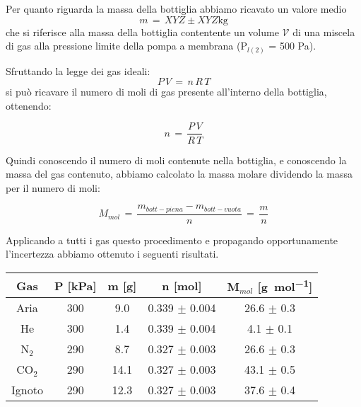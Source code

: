Per quanto riguarda la massa della bottiglia abbiamo ricavato un valore medio
\begin{equation}
	m \, = \, XYZ \pm XYZ \si{\kilogram}
\end{equation}
che si riferisce alla massa della bottiglia contentente un volume $\mathcal{V}$ di una miscela di gas alla pressione limite della pompa a membrana (P$_{l(2)}$ = 500 \si{\Pa}).


Sfruttando la legge dei gas ideali:
\begin{equation}
	P\,V \,=\, n\,R\,T
\end{equation}
%
si può ricavare il numero di moli di gas presente all'interno della bottiglia, ottenendo:

\begin{equation}
	n \,=\, \frac{P\,V}{R\,T}
\end{equation}

Quindi conoscendo il numero di moli contenute nella bottiglia, e conoscendo la massa del gas contenuto,
abbiamo calcolato la massa molare dividendo la massa per il numero di moli:

\begin{equation}
	M_{mol} \,=\, \frac{m_{bott-piena} - m_{bott-vuota}}{n}\,=\,\frac{m}{n}
\end{equation}

Applicando a tutti i gas questo procedimento e propagando opportunamente l'incertezza
abbiamo ottenuto i seguenti risultati. 

\begin{center}
    \begin{tabular}{c c c c c}
        \toprule
        Gas & P [\si{\kilo\pascal}] & m [\si{\gram}] & n [\si{\mole}] & M$_{mol}$ [\si{\gram\per\mole}] \\
        \midrule
        Aria            & 300 &  9.0 & 0.339 $\pm$ 0.004 & 26.6 $\pm$ 0.3 \\
        He              & 300 &  1.4 & 0.339 $\pm$ 0.004 &  4.1 $\pm$ 0.1 \\
        N$_2$           & 290 &  8.7 & 0.327 $\pm$ 0.003 & 26.6 $\pm$ 0.3 \\
        CO$_2$          & 290 & 14.1 & 0.327 $\pm$ 0.003 & 43.1 $\pm$ 0.5 \\
        Ignoto          & 290 & 12.3 & 0.327 $\pm$ 0.003 & 37.6 $\pm$ 0.4 \\
        \bottomrule
    \end{tabular}
\end{center}

